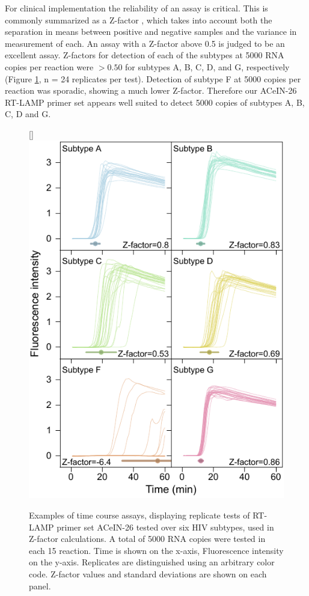 \documentclass[../sherrill-Mix_thesis.tex]{subfiles}
\begin{document}
			For clinical implementation the reliability of an assay is critical. This is commonly summarized as a Z-factor \citep{Zhang1999}, which takes into account both the separation in means between positive and negative samples and the variance in measurement of each. An assay with a Z-factor above 0.5 is judged to be an excellent assay. Z-factors for detection of each of the subtypes at 5000 RNA copies per reaction were $>0.50$ for subtypes A, B, C, D, and G, respectively (Figure \ref{figZFactor}, n = 24 replicates per test). Detection of subtype F at 5000 copies per reaction was sporadic, showing a much lower Z-factor. Therefore our ACeIN-26 RT-LAMP primer set appears well suited to detect 5000 copies of subtypes A, B, C, D and G.

			\begin{figure}
			[\FBwidth]{
				\includegraphics[width=.6\textwidth]{4.pdf} %
				}{
					\caption[Replicate tests of the ACeIN-26 primer set over six HIV subtypes]{Examples of time course assays, displaying replicate tests of RT-LAMP primer set ACeIN-26 tested over six HIV subtypes, used in Z-factor calculations. A total of 5000 RNA copies were tested in each 15 \uL{} reaction. Time is shown on the x-axis, Fluorescence intensity on the y-axis. Replicates are distinguished using an arbitrary color code. Z-factor values and standard deviations are shown on each panel.}
					\label{figZFactor}
				}
			\end{figure}
\end{document}
